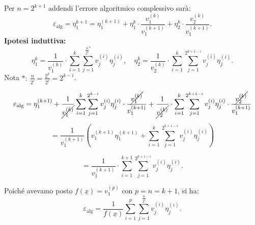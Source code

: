 \begin{dimo}
Per $n = 2^{k+1}$ addendi l'errore algoritmico complessivo sarà:
\[\varepsilon_{\textrm{alg}} = \eta_1^{k+1} = \eta_1^{(k+1)} + \eta_1^{k} \cdot
\frac{v_1^{(k)}}{v_1^{(k+1)}} + \eta_2^{k}\cdot\frac{v_2^{(k)}}{v_1^{(k+1)}}.\]
\textbf{Ipotesi induttiva:}
\[\eta_1^{k} = \frac{1}{v_1^{(k)}} \cdot \sum_{i=1}^k\sum_{j=1}^{\frac{n}{2^i}^* }
v_j^{(i)}\eta_j^{(i)}, \quad
\eta_2^{k} = \frac{1}{v_2^{(k)}} \cdot \sum_{i=1}^k\sum_{j=1}^{2^{k+1-i}}
v_j^{(i)}\eta_j^{(i)}.\]
Nota $*: \ \frac{n}{2^i} = \frac{2^k}{2^i} = 2^{k-i}$.

\[
\varepsilon_{\textrm{alg}} = \eta_1^{(k+1)} + \frac{1}{\cancel{v_1^{(k)}}} 
\sum_{i=1}^k\sum_{j=1}^{2^{k-i}}v_j^{(i)}\eta_j^{(i)}\cdot
\frac{\cancel{v_1^{(k)}}}{v_1^{(k+1)}} + \frac{1}{\cancel{v_2^{(k)}}}
\cdot \sum_{i=1}^k\sum_{j=1}^{2^{k+1-i}}v_j^{(i)}\eta_j^{(i)} \cdot
\frac{\cancel{v_2^{(k)}}}{v_1^{(k+1)}}
\]

\[
= \frac{1}{v_1^{(k+1)}} \left( 
v_1^{(k+1)}\eta_1^{(k+1)} + \sum_{i=1}^k\sum_{j=1}^{2^{k+1-i}}v_j^{(i)}\eta_j^{(i)}
\right)
\]

\[
=\frac{1}{v_1^{(k+1)}} \cdot \sum_{i=1}^{k+1}\sum_{j=1}^{2^{k+1-i}}v_j^{(i)}\eta_j^{(i)}
.\]

Poiché avevamo posto $f(\underline{x}) = v_1^{(p)}$ con $p = n = k+1$, si ha:
\[
\varepsilon_{\textrm{alg}} = \frac{1}{f(\underline{x})}\sum_{i=1}^p
\sum_{j=1}^{\frac{n}{2^i}}v_j^{(i)}\eta_j^{(i)}.
\]
\end{dimo}
